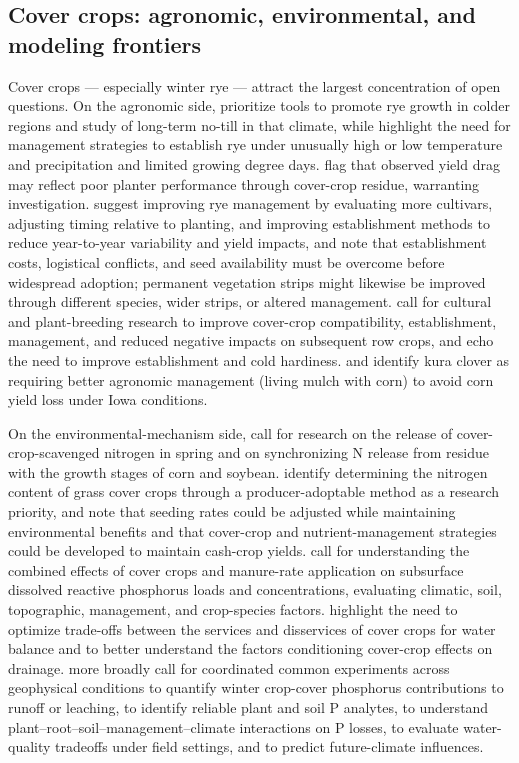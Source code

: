 \subsection{Cover crops: agronomic, environmental, and modeling frontiers}

Cover crops --- especially winter rye --- attract the largest concentration of open questions. On the agronomic side, \textcite{Waring2020} prioritize tools to promote rye growth in colder regions and study of long-term no-till in that climate, while \textcite{Bawa2023} highlight the need for management strategies to establish rye under unusually high or low temperature and precipitation and limited growing degree days. \textcite{Dougherty2020} flag that observed yield drag may reflect poor planter performance through cover-crop residue, warranting investigation. \textcite{Kaspar2007} suggest improving rye management by evaluating more cultivars, adjusting timing relative to planting, and improving establishment methods to reduce year-to-year variability and yield impacts, and note that establishment costs, logistical conflicts, and seed availability must be overcome before widespread adoption; permanent vegetation strips might likewise be improved through different species, wider strips, or altered management. \textcite{Dinnes2002} call for cultural and plant-breeding research to improve cover-crop compatibility, establishment, management, and reduced negative impacts on subsequent row crops, and \textcite{Liu2019} echo the need to improve establishment and cold hardiness. \textcite{Qi2011b} and \textcite{Qi2011} identify kura clover as requiring better agronomic management (living mulch with corn) to avoid corn yield loss under Iowa conditions.

On the environmental-mechanism side, \textcite{Lacey2015} call for research on the release of cover-crop-scavenged nitrogen in spring and on synchronizing N release from residue with the growth stages of corn and soybean. \textcite{Roth2018} identify determining the nitrogen content of grass cover crops through a producer-adoptable method as a research priority, and note that seeding rates could be adjusted while maintaining environmental benefits and that cover-crop and nutrient-management strategies could be developed to maintain cash-crop yields. \textcite{Askar2023} call for understanding the combined effects of cover crops and manure-rate application on subsurface dissolved reactive phosphorus loads and concentrations, evaluating climatic, soil, topographic, management, and crop-species factors. \textcite{Meyer2019} highlight the need to optimize trade-offs between the services and disservices of cover crops for water balance and to better understand the factors conditioning cover-crop effects on drainage. \textcite{Liu2019} more broadly call for coordinated common experiments across geophysical conditions to quantify winter crop-cover phosphorus contributions to runoff or leaching, to identify reliable plant and soil P analytes, to understand plant--root--soil--management--climate interactions on P losses, to evaluate water-quality tradeoffs under field settings, and to predict future-climate influences.

